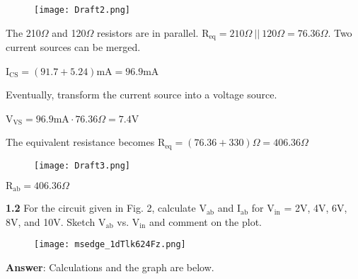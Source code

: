 \documentclass{article}
\begin{document}
\vspace{4mm}

\begin{figure}[H]
    \centering
    \texttt{[image: Draft2.png]}
\end{figure}

\vspace{4mm}

{The 210$\Omega$ and 120$\Omega$ resistors are in parallel. R$_\text{eq} = 210\Omega \ || \ 120\Omega = 76.36\Omega$. Two current sources can be merged.}

\vspace{4mm}

{I$_\text{CS} = (91.7 + 5.24)\text{mA} = 96.9\text{mA}$}

\vspace{4mm}

{Eventually, transform the current source into a voltage source.}

\vspace{4mm}

{V$_\text{VS} = 96.9\text{mA} \cdot 76.36\Omega = 7.4\text{V}$}

\vspace{4mm}

{The equivalent resistance becomes R$_\text{eq} = (76.36 + 330) \Omega = 406.36\Omega$}

\vspace{4mm}

\begin{figure}[H]
    \centering
    \texttt{[image: Draft3.png]}
\end{figure}

{$\boxed{\text{R}_\text{ab} = 406.36\Omega}$}

\vspace{8mm}

\newpage

{\textbf{1.2} For the circuit given in Fig. 2, calculate V$_{\text{ab}}$ and I$_{\text{ab}}$ for V$_{\text{in}}$ = 2V, 4V, 6V, 8V, and 10V. Sketch V$_{\text{ab}}$ vs. V$_{\text{in}}$ and comment on the plot.}

\begin{figure}[H]
    \centering
    \texttt{[image: msedge\_1dTlk624Fz.png]}
\end{figure}

{\textbf{Answer}: Calculations and the graph are below.}

\vspace{4mm}
\end{document}
